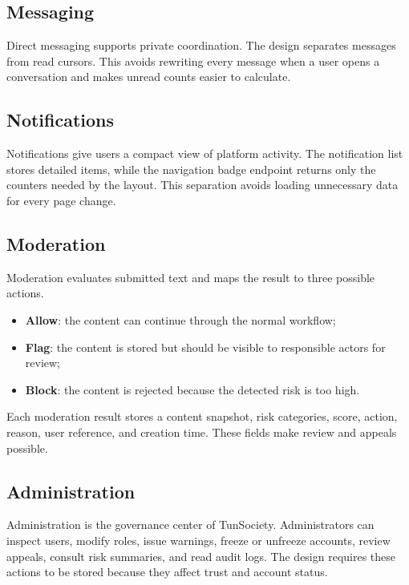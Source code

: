 \subsection{Messaging}

Direct messaging supports private coordination. The design separates messages from read cursors. This avoids rewriting every message when a user opens a conversation and makes unread counts easier to calculate.

\subsection{Notifications}

Notifications give users a compact view of platform activity. The notification list stores detailed items, while the navigation badge endpoint returns only the counters needed by the layout. This separation avoids loading unnecessary data for every page change.

\subsection{Moderation}

Moderation evaluates submitted text and maps the result to three possible actions.

\begin{itemize}
    \item \textbf{Allow}: the content can continue through the normal workflow;
    \item \textbf{Flag}: the content is stored but should be visible to responsible actors for review;
    \item \textbf{Block}: the content is rejected because the detected risk is too high.
\end{itemize}

Each moderation result stores a content snapshot, risk categories, score, action, reason, user reference, and creation time. These fields make review and appeals possible.

\subsection{Administration}

Administration is the governance center of TunSociety. Administrators can inspect users, modify roles, issue warnings, freeze or unfreeze accounts, review appeals, consult risk summaries, and read audit logs. The design requires these actions to be stored because they affect trust and account status.

